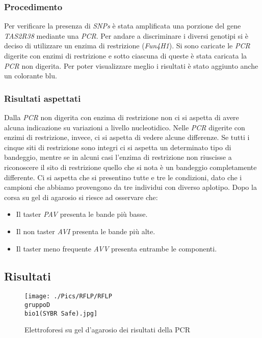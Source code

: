		\subsubsection*{Procedimento}
		Per verificare la presenza di \emph{SNPs} è stata amplificata una porzione del gene \emph{TAS2R38} mediante una \emph{PCR}.
		Per andare a discriminare i diversi genotipi si è deciso di utilizzare un enzima di restrizione (\emph{Fun4H1}). 
		Si sono caricate le \emph{PCR} digerite con enzimi di restrizione e sotto ciascuna di queste è stata caricata la \emph{PCR} non digerita. 
		Per poter visualizzare meglio i risultati è stato aggiunto anche un colorante blu. 
	   
		\subsubsection*{Risultati aspettati}
		Dalla \emph{PCR} non digerita con enzima di restrizione non ci si aspetta di avere alcuna indicazione su variazioni a livello nucleotidico. 
		Nelle \emph{PCR} digerite con enzimi di restrizione, invece, ci si aspetta di vedere alcune differenze. 
		Se tutti i cinque siti di restrizione sono integri ci si aspetta un determinato tipo di bandeggio, mentre se in alcuni casi l'enzima di restrizione non riuscisse a riconoscere il sito di restrizione quello che si nota è un bandeggio completamente differente. 
		Ci si aspetta che si presentino tutte e tre le condizioni, dato che i campioni che abbiamo provengono da tre individui con diverso aplotipo. 
		Dopo la corsa su gel di agarosio si riesce ad osservare che:
		\begin{itemize}
			\item Il taster \emph{PAV} presenta le bande più basse.
			\item Il non taster \emph{AVI} presenta le bande più alte.
			\item Il taster meno frequente \emph{AVV} presenta entrambe le componenti. 
		\end{itemize}
	
	\subsection*{Risultati}
	\begin{figure}[H]
		\centering
		\texttt{[image: ./Pics/RFLP/RFLP\\ gruppoD\\ bio1(SYBR Safe).jpg]}
		\caption{Elettroforesi su gel d'agarosio dei risultati della PCR}
		\label{fig10}
	\end{figure}

